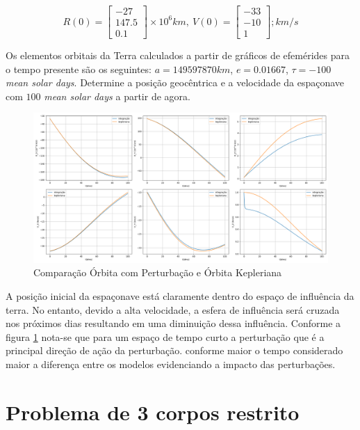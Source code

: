 \begin{equation}
R(0) = 
\left[\begin{array}{l}
-27 \\
147.5  \\
0.1
\end{array}\right] \times 10^{6} km, \ 
V(0) = 
\left[\begin{array}{l}
-33 \\
-10  \\
1
\end{array}\right]; km/s
\end{equation}

Os elementos orbitais da Terra calculados a partir de gráficos de efemérides para o tempo presente são os seguintes: $a = 149597870 km$, $e = 0.01667$, $\tau = -100$ \textit{mean solar days}. Determine a posição geocêntrica e a velocidade da espaçonave com $100$  \textit{mean solar days} a partir de agora. 

\begin{figure}[H]
\centering
\caption{Comparação Órbita com Perturbação e Órbita Kepleriana}
\label{fig: 1231}
\includegraphics[width=1\textwidth]{figuras/Resultados/ex6.2.png}
\fonte{Autores, 2023}
\end{figure}

A posição inicial da espaçonave está claramente dentro do espaço de influência da terra. No entanto, devido a alta velocidade, a esfera de influência será cruzada nos próximos dias resultando em uma diminuição dessa influência. Conforme a figura \ref{fig: 1231} nota-se que para um espaço de tempo curto a perturbação que é a principal direção de ação da perturbação. conforme maior o tempo considerado maior a diferença entre os modelos evidenciando a impacto das perturbações.

\section{Problema de 3 corpos restrito}
